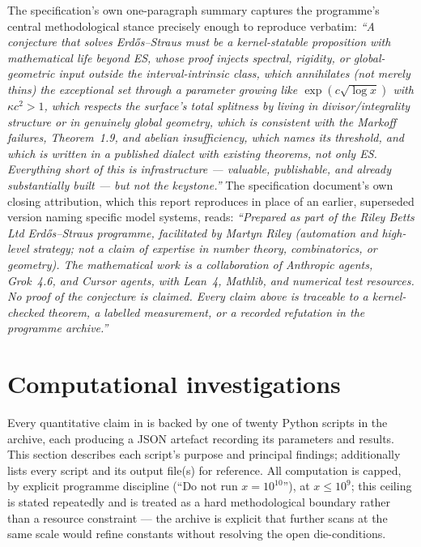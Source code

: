 \documentclass[11pt]{article}
\theoremstyle{plain}
\theoremstyle{definition}
\theoremstyle{remark}
\renewcommand{\_}{\textunderscore\allowbreak}
\begin{document}
The specification's own one-paragraph summary captures the programme's central methodological
stance precisely enough to reproduce verbatim: \emph{``A conjecture that solves Erd\H{o}s--Straus
must be a kernel-statable proposition with mathematical life beyond ES, whose proof injects
spectral, rigidity, or global-geometric input outside the interval-intrinsic class, which
annihilates (not merely thins) the exceptional set through a parameter growing like
$\exp(c\sqrt{\log x})$ with $\kappa c^2>1$, which respects the surface's total splitness by
living in divisor/integrality structure or in genuinely global geometry, which is consistent
with the Markoff failures, Theorem~1.9, and abelian insufficiency, which names its threshold,
and which is written in a published dialect with existing theorems, not only ES. Everything short
of this is infrastructure — valuable, publishable, and already substantially built — but not the
keystone.''} The specification document's own closing attribution, which this report reproduces
in place of an earlier, superseded version naming specific model systems, reads: \emph{``Prepared
as part of the Riley Betts Ltd Erd\H{o}s--Straus programme, facilitated by Martyn Riley
(automation and high-level strategy; not a claim of expertise in number theory, combinatorics,
or geometry). The mathematical work is a collaboration of Anthropic agents, Grok~4.6, and
Cursor agents, with Lean~4, Mathlib, and numerical test resources. No proof of the conjecture is
claimed. Every claim above is traceable to a kernel-checked theorem, a labelled measurement, or a
recorded refutation in the programme archive.''}


\section{Computational investigations}
\label{sec:computation}

Every quantitative claim in  is backed by one of twenty Python
scripts in the archive, each producing a JSON artefact recording its parameters and results. This
section describes each script's purpose and principal findings;  additionally
lists every script and its output file(s) for reference. All computation is capped, by explicit
programme discipline (``Do not run $x=10^{10}$''), at $x\le10^9$; this ceiling is stated
repeatedly and is treated as a hard methodological boundary rather than a resource constraint —
the archive is explicit that further scans at the same scale would refine constants without
resolving the open die-conditions.
\end{document}
